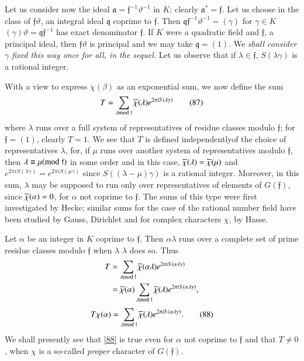 Let us consider now the ideal
$\mathfrak{a}=\mathfrak{f}^{-1}\vartheta^{-1}$ in $K$; clearly
$\mathfrak{a}^{\ast}=\mathfrak{f}$. Let us choose in the class of
$\mathfrak{f}\vartheta$, an integral ideal $\mathfrak{q}$ coprime to
$\mathfrak{f}$. Then
$\mathfrak{q}\mathfrak{f}^{-1}\vartheta^{-1}=(\gamma)$ for $\gamma\in
K$ \ie $(\gamma)\vartheta=\mathfrak{q}\mathfrak{f}^{-1}$ has exact
denominator $\mathfrak{f}$. If $K$ were a quadratic field and
$\mathfrak{f}$, a principal ideal, then $\mathfrak{f}\vartheta$ is
principal and we may take $\mathfrak{q}=(1)$. We {\em shall consider
  $\gamma$ fixed this way once for all, in the sequel.} Let us observe
that if $\lambda\in\mathfrak{f}$, $S(\lambda\gamma)$ is a rational
integer.

With a view to express $\chi(\beta)$ as an exponential sum, we now
define the sum
\begin{equation*}
T=\sum_{\lambda\rm{mod} \;\mathfrak{f}}\overline{\chi}(\lambda)e^{2\pi
  iS(\lambda\gamma)}\tag{87}\label{87} 
\end{equation*}
where $\lambda$ runs over a full system of representatives of residue
classes modulo $\mathfrak{f}$; for $\mathfrak{f}=(1)$, clearly
$T=1$. We see that $T$ is defined independently\pageoriginale of the
choice of representatives $\lambda$, for, if $\mu$ runs over another
system of representatives modulo $\mathfrak{f}$, then $\lambda\equiv
\mu(\rm{mod} \; \mathfrak{f})$ in some order and in this case,
$\overline{\chi}(\lambda)=\overline{\chi}(\mu)$ and $e^{2\pi
  iS(\lambda\gamma)}=e^{2\pi iS(\mu\gamma)}$ since
  $S((\lambda-\mu)\gamma)$ is a rational integer. Moreover, in this
  sum, $\lambda$ may be supposed to run only over representatives of
  elements of $G(\mathfrak{f})$, since $\overline{\chi}(\alpha)=0$, for
  $\alpha$ not coprime to $\mathfrak{f}$. The sums of this type were
  first investigated by Hecke; similar sums for the case of the
  rational number field have been studied by Gauss, Dirichlet and for
  complex characters $\chi$, by Hasse.

Let $\alpha$ be an integer in $K$ coprime to $\mathfrak{f}$. Then
$\alpha\lambda$ runs over a complete set of prime residue classes
modulo $\mathfrak{f}$ when $\lambda$ $\lambda$ does so. Thus
\begin{align*}
T &= \sum_{\lambda\rm{mod} \; \mathfrak{f}}\overline{\chi}(\alpha\lambda)e^{2\pi
  iS(\alpha\lambda\gamma)}\\
&= \overline{\chi}(\alpha)\sum_{\lambda\rm{mod} \;
  \mathfrak{f}}\overline{\chi}(\lambda)e^{2\pi iS(\alpha\lambda\gamma)},
\end{align*}
\ie
\begin{equation*}
T\chi(\alpha)=\sum_{\lambda\rm{mod} \;\mathfrak{f}}\overline{\chi}(\lambda)e^{2\pi
  iS(\alpha\lambda\gamma)}.\tag{88}\label{88} 
\end{equation*}
We shall presently see that \eqref{88} is true even for $\alpha$ not
coprime to $\mathfrak{f}$ and that $T\neq 0$, when $\chi$ is a
so-called {\em proper} character of $G(\mathfrak{f})$.

